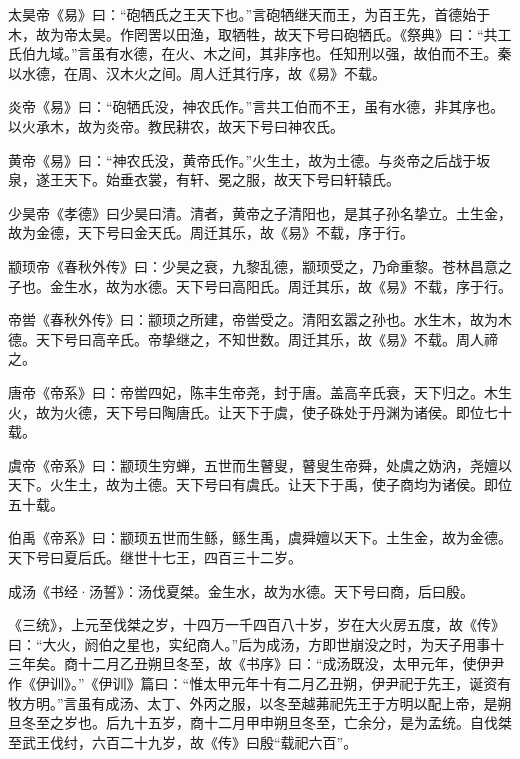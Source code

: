 \documentclass[12pt,UTF8]{ctexbook}
\begin{document}
太昊帝《易》曰：“砲牺氏之王天下也。”言砲牺继天而王，为百王先，首德始于木，故为帝太昊。作罔罟以田渔，取牺牲，故天下号曰砲牺氏。《祭典》曰：“共工氏伯九域。”言虽有水德，在火、木之间，其非序也。任知刑以强，故伯而不王。秦以水德，在周、汉木火之间。周人迁其行序，故《易》不载。



炎帝《易》曰：“砲牺氏没，神农氏作。”言共工伯而不王，虽有水德，非其序也。以火承木，故为炎帝。教民耕农，故天下号曰神农氏。



黄帝《易》曰：“神农氏没，黄帝氏作。”火生土，故为土德。与炎帝之后战于坂泉，遂王天下。始垂衣裳，有轩、冕之服，故天下号曰轩辕氏。



少昊帝《孝德》曰少昊曰清。清者，黄帝之子清阳也，是其子孙名挚立。土生金，故为金德，天下号曰金天氏。周迁其乐，故《易》不载，序于行。



颛顼帝《春秋外传》曰：少昊之衰，九黎乱德，颛顼受之，乃命重黎。苍林昌意之子也。金生水，故为水德。天下号曰高阳氏。周迁其乐，故《易》不载，序于行。



帝喾《春秋外传》曰：颛顼之所建，帝喾受之。清阳玄嚣之孙也。水生木，故为木德。天下号曰高辛氏。帝挚继之，不知世数。周迁其乐，故《易》不载。周人禘之。



唐帝《帝系》曰：帝喾四妃，陈丰生帝尧，封于唐。盖高辛氏衰，天下归之。木生火，故为火德，天下号曰陶唐氏。让天下于虞，使子硃处于丹渊为诸侯。即位七十载。



虞帝《帝系》曰：颛顼生穷蝉，五世而生瞽叟，瞽叟生帝舜，处虞之妫汭，尧嬗以天下。火生土，故为土德。天下号曰有虞氏。让天下于禹，使子商均为诸侯。即位五十载。



伯禹《帝系》曰：颛顼五世而生鲧，鲧生禹，虞舜嬗以天下。土生金，故为金德。天下号曰夏后氏。继世十七王，四百三十二岁。



成汤《书经·汤誓》：汤伐夏桀。金生水，故为水德。天下号曰商，后曰殷。



《三统》，上元至伐桀之岁，十四万一千四百八十岁，岁在大火房五度，故《传》曰：“大火，阏伯之星也，实纪商人。”后为成汤，方即世崩没之时，为天子用事十三年矣。商十二月乙丑朔旦冬至，故《书序》曰：“成汤既没，太甲元年，使伊尹作《伊训》。”《伊训》篇曰：“惟太甲元年十有二月乙丑朔，伊尹祀于先王，诞资有牧方明。”言虽有成汤、太丁、外丙之服，以冬至越茀祀先王于方明以配上帝，是朔旦冬至之岁也。后九十五岁，商十二月甲申朔旦冬至，亡余分，是为孟统。自伐桀至武王伐纣，六百二十九岁，故《传》曰殷“载祀六百”。
\end{document}
